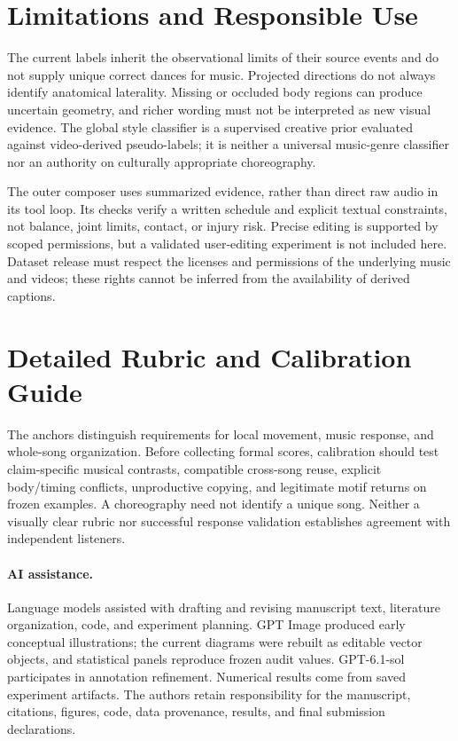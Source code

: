 \section{Limitations and Responsible Use}
The current labels inherit the observational limits of their source
events and do not supply unique correct dances for music. Projected
directions do not always identify anatomical laterality. Missing or
occluded body regions can produce uncertain geometry, and richer
wording must not be interpreted as new visual evidence. The global
style classifier is a supervised creative prior evaluated against
video-derived pseudo-labels; it is neither a universal music-genre
classifier nor an authority on culturally appropriate choreography.

The outer composer uses summarized evidence, rather than direct raw
audio in its tool loop. Its checks verify a written schedule and
explicit textual constraints, not balance, joint limits, contact, or
injury risk. Precise editing is supported by scoped permissions, but a
validated user-editing experiment is not included here. Dataset release
must respect the licenses and permissions of the underlying music and
videos; these rights cannot be inferred from the availability of
derived captions.

\section{Detailed Rubric and Calibration Guide}
\label{sec:rubric-guide}


The anchors distinguish requirements for local movement, music response,
and whole-song organization. Before collecting formal scores, calibration
should test claim-specific musical contrasts, compatible cross-song reuse,
explicit body/timing conflicts, unproductive copying, and legitimate motif
returns on frozen examples. A choreography need not identify a unique song.
Neither a visually clear rubric nor successful response validation
establishes agreement with independent listeners.

\paragraph{AI assistance.}
Language models assisted with drafting and revising manuscript text,
literature organization, code, and experiment planning. GPT Image
produced early conceptual illustrations; the current diagrams were rebuilt
as editable vector objects, and statistical panels reproduce frozen
audit values. GPT-6.1-sol participates in annotation refinement.
Numerical results come from saved experiment artifacts. The authors
retain responsibility for the manuscript, citations, figures, code,
data provenance, results, and final submission declarations.

